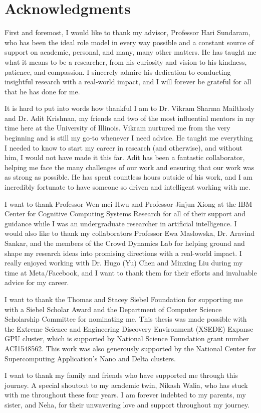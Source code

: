 \begingroup
\let\clearpage\relax
\let\cleardoublepage\relax
\let\cleardoublepage\relax
\chapter*{Acknowledgments}

First and foremost, I would like to thank my advisor, Professor Hari Sundaram, who has been the ideal role model in every way possible and a constant source of support on academic, personal, and many, many other matters. He has taught me what it means to be a researcher, from his curiosity and vision to his kindness, patience, and compassion. I sincerely admire his dedication to conducting insightful research with a real-world impact, and I will forever be grateful for all that he has done for me.

It is hard to put into words how thankful I am to Dr. Vikram Sharma Mailthody and Dr. Adit Krishnan, my friends and two of the most influential mentors in my time here at the University of Illinois. Vikram nurtured me from the very beginning and is still my go-to whenever I need advice. He taught me everything I needed to know to start my career in research (and otherwise), and without him, I would not have made it this far. Adit has been a fantastic collaborator, helping me face the many challenges of our work and ensuring that our work was as strong as possible. He has spent countless hours outside of his work, and I am incredibly fortunate to have someone so driven and intelligent working with me.

I want to thank Professor Wen-mei Hwu and Professor Jinjun Xiong at the IBM Center for Cognitive Computing Systems Research for all of their support and guidance while I was an undergraduate researcher in artificial intelligence. I would also like to thank my collaborators Professor Ewa Maslowska, Dr. Aravind Sankar, and the members of the Crowd Dynamics Lab for helping ground and shape my research ideas into promising directions with a real-world impact. I really enjoyed working with Dr. Hugo (Yu) Chen and Minxing Liu during my time at Meta/Facebook, and I want to thank them for their efforts and invaluable advice for my career.

I want to thank the Thomas and Stacey Siebel Foundation for supporting me with a Siebel Scholar Award and the Department of Computer Science Scholarship Committee for nominating me. This thesis was made possible with the Extreme Science and Engineering Discovery Environment (XSEDE) Expanse GPU cluster, which is supported by National Science Foundation grant number ACI1548562. This work was also generously supported by the National Center for Supercomputing Application’s Nano and Delta clusters.

I want to thank my family and friends who have supported me through this journey. A special shoutout to my academic twin, Nikash Walia, who has stuck with me throughout these four years. I am forever indebted to my parents, my sister, and Neha, for their unwavering love and support throughout my journey.


\endgroup
